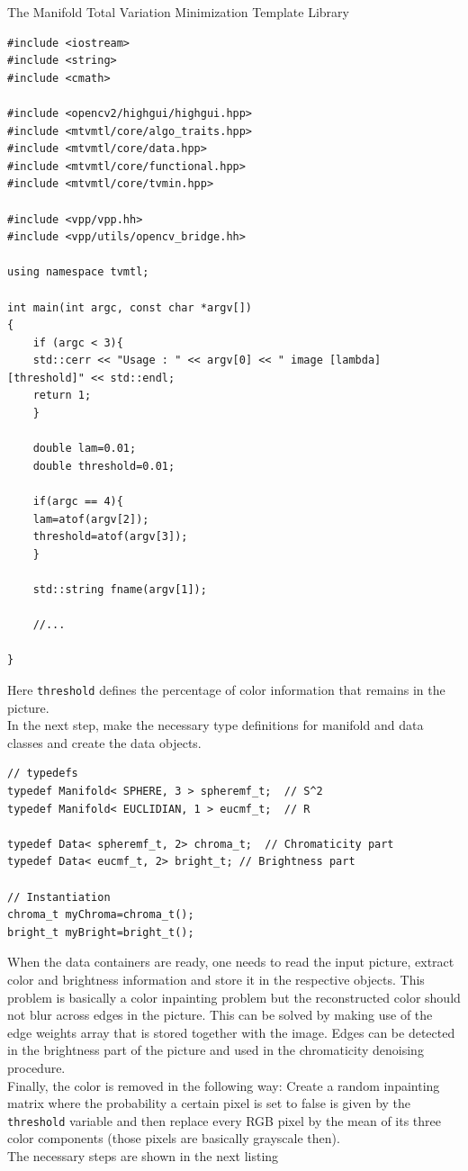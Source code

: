 \begin{chapter}{The Manifold Total Variation Minimization Template Library}
\cppinline
\begin{lstlisting}[label=code:tut2_init,caption={Include library files and read parameters from standard input}]
#include <iostream>
#include <string>
#include <cmath>

#include <opencv2/highgui/highgui.hpp>
#include <mtvmtl/core/algo_traits.hpp>
#include <mtvmtl/core/data.hpp>
#include <mtvmtl/core/functional.hpp>
#include <mtvmtl/core/tvmin.hpp>

#include <vpp/vpp.hh>
#include <vpp/utils/opencv_bridge.hh>

using namespace tvmtl;

int main(int argc, const char *argv[])
{
    if (argc < 3){
	std::cerr << "Usage : " << argv[0] << " image [lambda] [threshold]" << std::endl;
	return 1;
    }

    double lam=0.01;
    double threshold=0.01;

    if(argc == 4){
	lam=atof(argv[2]);
	threshold=atof(argv[3]);
    }   

    std::string fname(argv[1]);

    //...

}
\end{lstlisting}
Here \texttt{threshold} defines the percentage of color information that remains in the picture.\\
In the next step, make the necessary type definitions for manifold and data classes and create the data objects.

\cppinline
\begin{lstlisting}[label=code:tut2_mfdata,caption={Manifold and Data class type definitions and instantiation}]
// typedefs
typedef Manifold< SPHERE, 3 > spheremf_t;  // S^2
typedef Manifold< EUCLIDIAN, 1 > eucmf_t;  // R
 
typedef Data< spheremf_t, 2> chroma_t;	// Chromaticity part
typedef Data< eucmf_t, 2> bright_t;	// Brightness part

// Instantiation
chroma_t myChroma=chroma_t();
bright_t myBright=bright_t();
\end{lstlisting}

When the data containers are ready, one needs to read the input picture, extract color and brightness information and store it in the respective objects.
This problem is basically a color inpainting problem but the reconstructed color should not blur across edges in the picture. This can be solved
by making use of the edge weights array that is stored together with the image. Edges can be detected in the brightness part of the picture and used in the chromaticity denoising procedure.\\
Finally, the color is removed in the following way: Create a random inpainting matrix where the probability a certain pixel is set to false is given
by the \texttt{threshold} variable and then replace every RGB pixel by the mean of its three color components (those pixels are basically grayscale then).\\
The necessary steps are shown in the next listing


\end{chapter}
